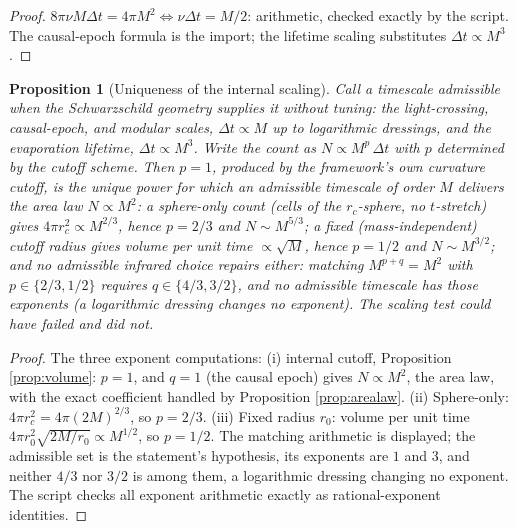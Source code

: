 \documentclass[11pt]{article}
\newtheorem{proposition}[theorem]{Proposition}
\theoremstyle{definition}
\begin{document}
\begin{proof}
$8\pi\nu M\Delta t = 4\pi M^2 \iff \nu\Delta t = M/2$: arithmetic, checked exactly by the script. The causal-epoch formula is the import; the lifetime scaling substitutes $\Delta t \propto M^3$.
\end{proof}

\begin{proposition}[Uniqueness of the internal scaling]\label{prop:unique}
Call a timescale \emph{admissible} when the Schwarzschild geometry supplies it without tuning: the light-crossing, causal-epoch, and modular scales, $\Delta t \propto M$ up to logarithmic dressings, and the evaporation lifetime, $\Delta t \propto M^3$. Write the count as $N \propto M^p\,\Delta t$ with $p$ determined by the cutoff scheme. Then $p = 1$, produced by the framework's own curvature cutoff, is the \emph{unique} power for which an admissible timescale of order $M$ delivers the area law $N \propto M^2$: a sphere-only count (cells of the $r_c$-sphere, no $t$-stretch) gives $4\pi r_c^2 \propto M^{2/3}$, hence $p = 2/3$ and $N \sim M^{5/3}$; a fixed (mass-independent) cutoff radius gives volume per unit time $\propto \sqrt{M}$, hence $p = 1/2$ and $N \sim M^{3/2}$; and no admissible infrared choice repairs either: matching $M^{p + q} = M^2$ with $p \in \{2/3, 1/2\}$ requires $q \in \{4/3, 3/2\}$, and no admissible timescale has those exponents (a logarithmic dressing changes no exponent). The scaling test could have failed and did not.
\end{proposition}

\begin{proof}
The three exponent computations: (i) internal cutoff, Proposition \ref{prop:volume}: $p = 1$, and $q = 1$ (the causal epoch) gives $N \propto M^2$, the area law, with the exact coefficient handled by Proposition \ref{prop:arealaw}. (ii) Sphere-only: $4\pi r_c^2 = 4\pi(2M)^{2/3}$, so $p = 2/3$. (iii) Fixed radius $r_0$: volume per unit time $4\pi r_0^2\sqrt{2M/r_0} \propto M^{1/2}$, so $p = 1/2$. The matching arithmetic is displayed; the admissible set is the statement's hypothesis, its exponents are $1$ and $3$, and neither $4/3$ nor $3/2$ is among them, a logarithmic dressing changing no exponent. The script checks all exponent arithmetic exactly as rational-exponent identities.
\end{proof}
\end{document}
